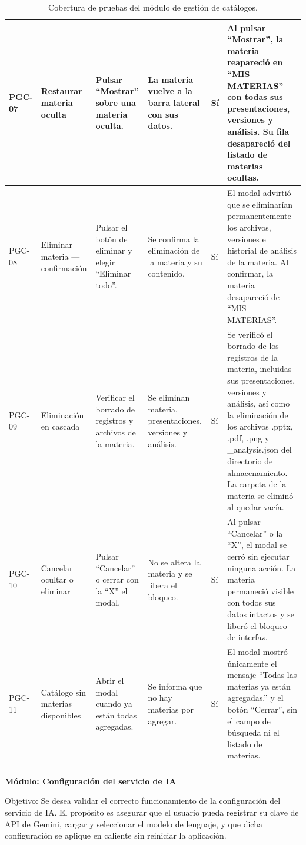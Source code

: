\documentclass[11pt]{article}
\begin{document}
{\begin{longtable}{@{}|L{1.2cm}|L{2.5cm}|L{3.4cm}|L{3.8cm}|L{1.5cm}|L{2.3cm}|@{}}
PGC-07 & Restaurar materia oculta & Pulsar ``Mostrar'' sobre una materia oculta. & La materia vuelve a la barra lateral con sus datos. & Sí & Al pulsar “Mostrar”, la materia reapareció en “MIS MATERIAS” con todas sus presentaciones, versiones y análisis. Su fila desapareció del listado de materias ocultas. \\ \hline
PGC-08 & Eliminar materia — confirmación & Pulsar el botón de eliminar y elegir ``Eliminar todo''. & Se confirma la eliminación de la materia y su contenido. & Sí & El modal advirtió que se eliminarían permanentemente los archivos, versiones e historial de análisis de la materia. Al confirmar, la materia desapareció de “MIS MATERIAS”. \\ \hline
PGC-09 & Eliminación en cascada & Verificar el borrado de registros y archivos de la materia. & Se eliminan materia, presentaciones, versiones y análisis. & Sí & Se verificó el borrado de los registros de la materia, incluidas sus presentaciones, versiones y análisis, así como la eliminación de los archivos .pptx, .pdf, .png y \_analysis.json del directorio de almacenamiento. La carpeta de la materia se eliminó al quedar vacía. \\ \hline
PGC-10 & Cancelar ocultar o eliminar & Pulsar ``Cancelar'' o cerrar con la ``X'' el modal. & No se altera la materia y se libera el bloqueo. & Sí & Al pulsar “Cancelar” o la “X”, el modal se cerró sin ejecutar ninguna acción. La materia permaneció visible con todos sus datos intactos y se liberó el bloqueo de interfaz. \\ \hline
PGC-11 & Catálogo sin materias disponibles & Abrir el modal cuando ya están todas agregadas. & Se informa que no hay materias por agregar. & Sí & El modal mostró únicamente el mensaje “Todas las materias ya están agregadas.” y el botón “Cerrar”, sin el campo de búsqueda ni el listado de materias. \\ \hline
\caption{Cobertura de pruebas del módulo de gestión de catálogos.}
\label{tab:cobertura-catalogos}
\end{longtable}
}




\textbf{Módulo: Configuración del servicio de IA}

Objetivo: Se desea validar el correcto funcionamiento de la configuración del servicio de IA. El propósito es asegurar que el usuario pueda registrar su clave de API de Gemini, cargar y seleccionar el modelo de lenguaje, y que dicha configuración se aplique en caliente sin reiniciar la aplicación.
\end{document}
